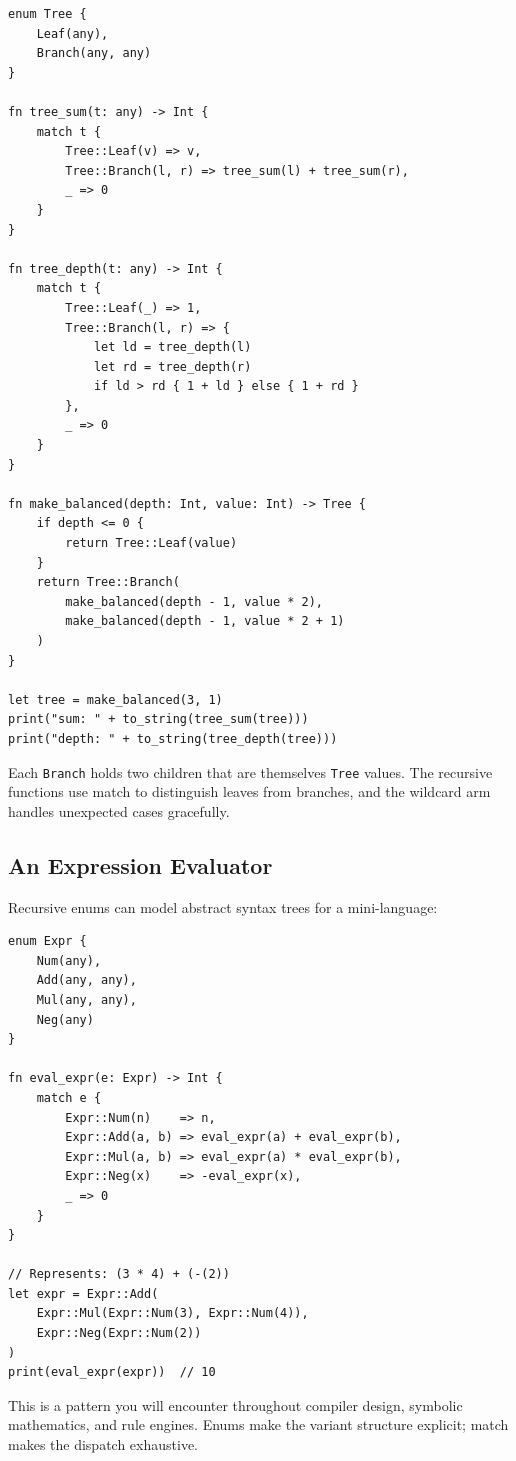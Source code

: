 \begin{lstlisting}[language=Lattice, caption={A recursive binary tree}]
enum Tree {
    Leaf(any),
    Branch(any, any)
}

fn tree_sum(t: any) -> Int {
    match t {
        Tree::Leaf(v) => v,
        Tree::Branch(l, r) => tree_sum(l) + tree_sum(r),
        _ => 0
    }
}

fn tree_depth(t: any) -> Int {
    match t {
        Tree::Leaf(_) => 1,
        Tree::Branch(l, r) => {
            let ld = tree_depth(l)
            let rd = tree_depth(r)
            if ld > rd { 1 + ld } else { 1 + rd }
        },
        _ => 0
    }
}

fn make_balanced(depth: Int, value: Int) -> Tree {
    if depth <= 0 {
        return Tree::Leaf(value)
    }
    return Tree::Branch(
        make_balanced(depth - 1, value * 2),
        make_balanced(depth - 1, value * 2 + 1)
    )
}

let tree = make_balanced(3, 1)
print("sum: " + to_string(tree_sum(tree)))
print("depth: " + to_string(tree_depth(tree)))
\end{lstlisting}

Each \lstinline|Branch| holds two children that are themselves
\lstinline|Tree| values. The recursive functions use match to distinguish
leaves from branches, and the wildcard arm handles unexpected cases
gracefully.

\subsection{An Expression Evaluator}

Recursive enums can model abstract syntax trees for a mini-language:

\begin{lstlisting}[language=Lattice, caption={An expression tree evaluator}]
enum Expr {
    Num(any),
    Add(any, any),
    Mul(any, any),
    Neg(any)
}

fn eval_expr(e: Expr) -> Int {
    match e {
        Expr::Num(n)    => n,
        Expr::Add(a, b) => eval_expr(a) + eval_expr(b),
        Expr::Mul(a, b) => eval_expr(a) * eval_expr(b),
        Expr::Neg(x)    => -eval_expr(x),
        _ => 0
    }
}

// Represents: (3 * 4) + (-(2))
let expr = Expr::Add(
    Expr::Mul(Expr::Num(3), Expr::Num(4)),
    Expr::Neg(Expr::Num(2))
)
print(eval_expr(expr))  // 10
\end{lstlisting}

This is a pattern you will encounter throughout compiler design, symbolic
mathematics, and rule engines. Enums make the variant structure explicit;
match makes the dispatch exhaustive.

